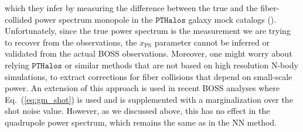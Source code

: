                                                                                                                                                                                                                                                                          which they infer by measuring the difference between 
                                                                                                                                                                                                                                                                         the true and the fiber-collided power spectrum monopole in the $\mathtt{PTHalos}$ 
                                                                                                                                                                                                                                                                         galaxy mock catalogs (\citealt{Manera:2013aa}). Unfortunately, since the true 
                                                                                                                                                                                                                                                                         power spectrum is the measurement we are trying to recover from the observations, the 
                                                                                                                                                                                                                                                                         $x_\mathrm{PS}$ parameter cannot be inferred or validated from the actual 
                                                                                                                                                                                                                                                                         BOSS observations. Moreover, one might worry about relying $\mathtt{PTHalos}$ or similar methods that are not based on 
                                                                                                                                                                                                                                                                         high resolution N-body simulations, to extract corrections for fiber collisions that depend on small-scale power. An extension of this approach is used in recent BOSS analyses  \citep{Beutler:2016aa,Grieb:2016aa,Gil-Marin:2016aa} where Eq.~(\ref{eq:gm_shot}) is used and is supplemented with a marginalization over the shot noise value. However, as we discussed above, this has no effect in the quadrupole power spectrum, which remains the same as in the NN method.

